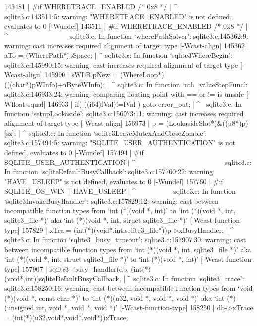{{{{{{{{{{{{{{{{{{{{143481 | #if WHERETRACE_ENABLED /* 0x8 */
       |     ^~~~~~~~~~~~~~~~~~
sqlite3.c:143511:5: warning: "WHERETRACE_ENABLED" is not defined, evaluates to 0 [-Wundef]
143511 | #if WHERETRACE_ENABLED /* 0x8 */
       |     ^~~~~~~~~~~~~~~~~~
sqlite3.c: In function ‘wherePathSolver’:
sqlite3.c:145362:9: warning: cast increases required alignment of target type [-Wcast-align]
145362 |   aTo = (WherePath*)pSpace;
       |         ^
sqlite3.c: In function ‘sqlite3WhereBegin’:
sqlite3.c:145990:15: warning: cast increases required alignment of target type [-Wcast-align]
145990 |   sWLB.pNew = (WhereLoop*)(((char*)pWInfo)+nByteWInfo);
       |               ^
sqlite3.c: In function ‘nth_valueStepFunc’:
sqlite3.c:146933:24: warning: comparing floating point with == or != is unsafe [-Wfloat-equal]
146933 |         if( ((i64)fVal)!=fVal ) goto error_out;
       |                        ^~
sqlite3.c: In function ‘setupLookaside’:
sqlite3.c:156973:11: warning: cast increases required alignment of target type [-Wcast-align]
156973 |       p = (LookasideSlot*)&((u8*)p)[sz];
       |           ^
sqlite3.c: In function ‘sqlite3LeaveMutexAndCloseZombie’:
sqlite3.c:157494:5: warning: "SQLITE_USER_AUTHENTICATION" is not defined, evaluates to 0 [-Wundef]
157494 | #if SQLITE_USER_AUTHENTICATION
       |     ^~~~~~~~~~~~~~~~~~~~~~~~~~
sqlite3.c: In function ‘sqliteDefaultBusyCallback’:
sqlite3.c:157760:22: warning: "HAVE_USLEEP" is not defined, evaluates to 0 [-Wundef]
157760 | #if SQLITE_OS_WIN || HAVE_USLEEP
       |                      ^~~~~~~~~~~
sqlite3.c: In function ‘sqlite3InvokeBusyHandler’:
sqlite3.c:157829:12: warning: cast between incompatible function types from ‘int (*)(void *, int)’ to ‘int (*)(void *, int,  sqlite3_file *)’ {aka ‘int (*)(void *, int,  struct sqlite3_file *)’} [-Wcast-function-type]
157829 |     xTra = (int(*)(void*,int,sqlite3_file*))p->xBusyHandler;
       |            ^
sqlite3.c: In function ‘sqlite3_busy_timeout’:
sqlite3.c:157907:30: warning: cast between incompatible function types from ‘int (*)(void *, int,  sqlite3_file *)’ {aka ‘int (*)(void *, int,  struct sqlite3_file *)’} to ‘int (*)(void *, int)’ [-Wcast-function-type]
157907 |     sqlite3_busy_handler(db, (int(*)(void*,int))sqliteDefaultBusyCallback,
       |                              ^
sqlite3.c: In function ‘sqlite3_trace’:
sqlite3.c:158250:16: warning: cast between incompatible function types from ‘void (*)(void *, const char *)’ to ‘int (*)(u32,  void *, void *, void *)’ {aka ‘int (*)(unsigned int,  void *, void *, void *)’} [-Wcast-function-type]
158250 |   db->xTrace = (int(*)(u32,void*,void*,void*))xTrace;
}}}}}}}}}}}}}}}}}}}}
